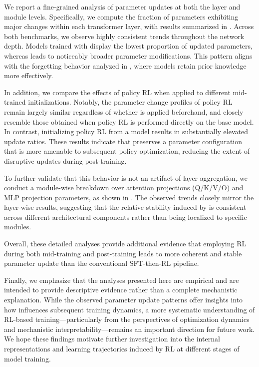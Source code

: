 
\label{subsec:appdix_mechanism}


We report a fine-grained analysis of parameter updates at both the layer and module levels. Specifically, we compute the fraction of parameters exhibiting major changes within each transformer layer, with results summarized in . Across both benchmarks, we observe highly consistent trends throughout the network depth. Models trained with \wmrlshort{} display the lowest proportion of updated parameters, whereas \wmsftshort{} leads to noticeably broader parameter modifications. This pattern aligns with the forgetting behavior analyzed in , where \wmrlshort{} models retain prior knowledge more effectively.

In addition, we compare the effects of policy RL when applied to different mid-trained initializations. Notably, the parameter change profiles of policy RL remain largely similar regardless of whether \wmrlshort{} is applied beforehand, and closely resemble those obtained when policy RL is performed directly on the base model. In contrast, initializing policy RL from a \wmsftshort{} model results in substantially elevated update ratios. These results indicate that \wmrlshort{} preserves a parameter configuration that is more amenable to subsequent policy optimization, reducing the extent of disruptive updates during post-training.

To further validate that this behavior is not an artifact of layer aggregation, we conduct a module-wise breakdown over attention projections (Q/K/V/O) and MLP projection parameters, as shown in . The observed trends closely mirror the layer-wise results, suggesting that the relative stability induced by \wmrlshort{} is consistent across different architectural components rather than being localized to specific modules.

Overall, these detailed analyses provide additional evidence that employing RL during both mid-training and post-training leads to more coherent and stable parameter update than the conventional SFT-then-RL pipeline. 

Finally, we emphasize that the analyses presented here are empirical and are intended to provide descriptive evidence rather than a complete mechanistic explanation. While the observed parameter update patterns offer insights into how \wmrlshort{} influences subsequent training dynamics, a more systematic understanding of RL-based training—particularly from the perspectives of optimization dynamics and mechanistic interpretability—remains an important direction for future work. We hope these findings motivate further investigation into the internal representations and learning trajectories induced by RL at different stages of model training.